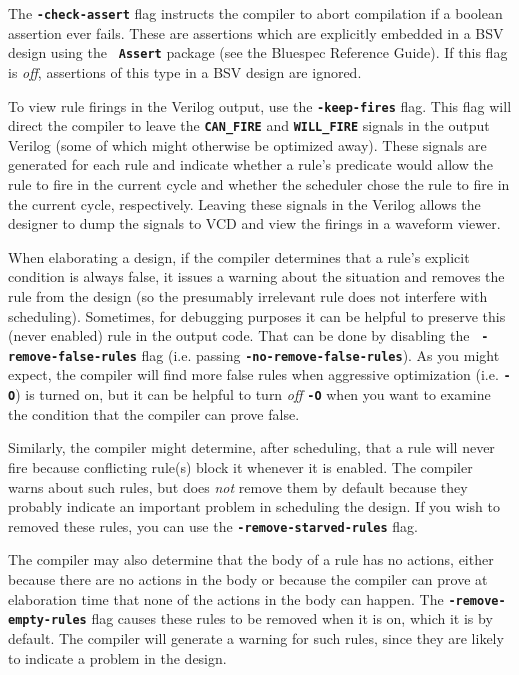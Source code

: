 \documentclass{article}
\begin{document}
The {\bf\tt -check-assert} flag instructs the compiler to abort
compilation if a boolean assertion ever fails. These are assertions
which are explicitly embedded in a BSV design using the {\bf\tt
Assert} package (see the Bluespec Reference Guide). If this flag is
\emph{off}, assertions of this type in a BSV design are ignored.


To view rule firings in the Verilog output, use the {\bf\tt -keep-fires}
flag.  This flag will direct the compiler to leave the
{\bf\tt CAN\_FIRE} and {\bf\tt WILL\_FIRE} signals in the
output Verilog (some of which might otherwise be optimized away).
These signals are generated for each rule and indicate whether a
rule's predicate would allow the rule to fire in the current cycle and
whether the scheduler chose the rule to fire in the current cycle,
respectively.  Leaving these signals in the Verilog allows the
designer to dump the signals to VCD and view the firings in a waveform
viewer.

When elaborating a design, if the compiler determines that a rule's
explicit condition is always false, it issues a warning about the
situation and removes the rule from the design (so the presumably
irrelevant rule does not interfere with scheduling). Sometimes, for
debugging purposes it can be helpful to preserve this (never enabled)
rule in the output code. That can be done by disabling the {\bf\tt
-remove-false-rules} flag (i.e. passing {\bf\tt -no-remove-false-rules}).
As you might expect, the compiler will find more false rules when
aggressive optimization (i.e. {\bf\tt -O}) is turned on,
but it can be helpful to turn \emph{off} {\bf\tt -O} when you
want to examine the condition that the compiler can prove false.

Similarly, the compiler might determine, after scheduling, that a
rule will never fire because conflicting rule(s) block it whenever
it is enabled. The compiler warns about such rules, but does \emph{not}
remove them by default because they probably indicate an important
problem in scheduling the design. If you wish to removed these rules,
you can use the {\bf\tt -remove-starved-rules} flag.

The compiler may also determine that the body of a rule has no
actions, either because there are no actions in the body  or because
the compiler can prove at elaboration time that none of the actions in
the body can happen.   The {\bf\tt -remove-empty-rules}
flag causes these rules to be removed when it is on, which it is by
default.  The compiler will generate a
warning for such rules, since they are likely to indicate a problem in
the design.
\end{document}
